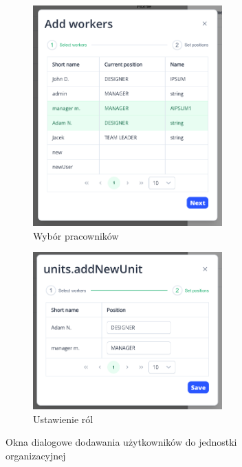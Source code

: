 \begin{figure}[H]
    \centering
    \begin{subfigure}[b]{0.49\textwidth}
        \centering
        \includegraphics[width=0.8\textwidth]{graf/front/selectWorkers.png}
        \caption{Wybór pracowników}
    \end{subfigure}
    \begin{subfigure}[b]{0.49\textwidth}
        \centering
        \includegraphics[width=0.8\textwidth]{graf/front/setPositions.png}
        \caption{Ustawienie ról}
    \end{subfigure}
    \caption{Okna dialogowe dodawania użytkowników do jednostki organizacyjnej}
\end{figure}

